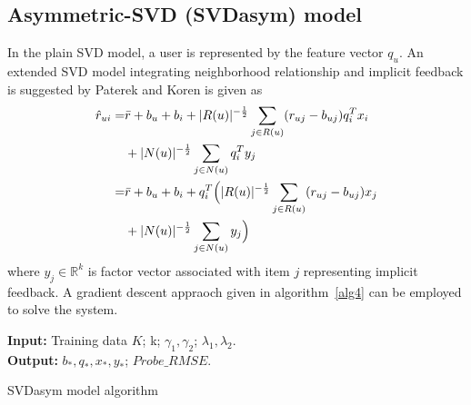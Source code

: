 \documentclass[journal]{IEEEtran}
\begin{document}
\subsection{Asymmetric-SVD (SVDasym) model}

In the plain SVD model, a user is represented by the feature vector $q_u$. An extended SVD model integrating neighborhood relationship and implicit feedback is suggested by Paterek \cite{Paterek} and Koren \cite{koren} is given as
\begin{align}
\label{eq10}
\hat{r}_{ui} = & \bar{r} + b_u + b_i + |R(u)|^{-\frac{1}{2}} \sum_{j \in R(u)} (r_{uj} - b_{uj})  q_i^T x_{i} \notag \\
& +  |N(u)|^{-\frac{1}{2}} \sum_{j \in N(u)}  q_i^T y_{j} \notag \\
= & \bar{r} + b_u + b_i +  q_i^T\Big(|R(u)|^{-\frac{1}{2}} \sum_{j \in R(u)} (r_{uj} - b_{uj})  x_{j} \notag \\
& +  |N(u)|^{-\frac{1}{2}} \sum_{j \in N(u)}  y_{j} \Big)
\end{align}
where $y_j \in \mathbb R^k$ is factor vector associated with item $j$ representing implicit feedback.  A gradient descent appraoch given in algorithm~\ref{alg4} can be employed to solve the system.
\begin{algorithm}[ht]
 \SetAlgoLined  %
 \textbf{Input:} {Training data $K$; k; $\gamma_1, \gamma_2$; $\lambda_1, \lambda_2$.} \\
 \textbf{Output:} {$b_*, q_*, x_*, y_*$; $Probe\_RMSE$.} \\


 \caption{SVDasym model algorithm}
\label{alg4}
\end{algorithm}
\end{document}

